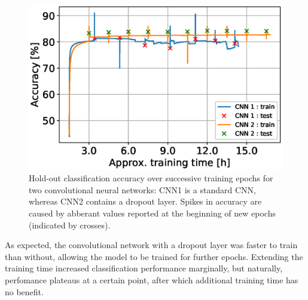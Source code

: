 \label{sec:results}
\begin{figure}[h!]
  \centering
  \includegraphics[scale=0.55]{CNNaccuracy}
  \caption{Hold-out classification accuracy over successive training epochs for two convolutional neural networks: CNN1 is a standard CNN, whereas CNN2 contains a dropout layer. Spikes in accuracy are caused by abberant values reported at the beginning of new epochs (indicated by crosses).}
  \label{plot:CNNaccuracy}
\end{figure}
\FloatBarrier

As expected, the convolutional network with a dropout layer was faster to train than without, allowing the model to be trained for further epochs. Extending the training time increased classification performance marginally, but naturally, perfomance plateaus at a certain point, after which additional training time has no benefit.
